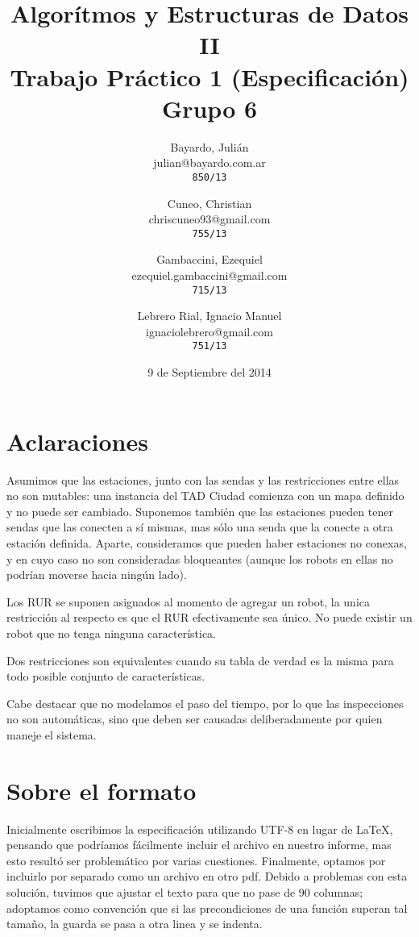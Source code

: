 \documentclass[a4paper,titlepage]{article}
\begin{document}
\title{Algorítmos y Estructuras de Datos II\\
Trabajo Práctico 1 (Especificación)\\
Grupo 6}

\author{
	Bayardo, Julián\\
	julian@bayardo.com.ar\\
	\texttt{850/13}
	\and
	Cuneo, Christian\\
	chriscuneo93@gmail.com\\
	\texttt{755/13}
	\and
	Gambaccini, Ezequiel\\
	ezequiel.gambaccini@gmail.com\\
	\texttt{715/13}
	\and
	Lebrero Rial, Ignacio Manuel\\
	ignaciolebrero@gmail.com\\
	\texttt{751/13}
}

\date{9 de Septiembre del 2014}

\maketitle

\section{Aclaraciones}

Asumimos que las estaciones, junto con las sendas y las restricciones entre ellas no son mutables: una instancia del TAD Ciudad comienza con un mapa definido y no puede ser cambiado. Suponemos también que las estaciones pueden tener sendas que las conecten a sí mismas, mas sólo una senda que la conecte a otra estación definida. Aparte, consideramos que pueden haber estaciones no conexas, y en cuyo caso no son consideradas bloqueantes (aunque los robots en ellas no podrían moverse hacia ningún lado).

Los RUR se suponen asignados al momento de agregar un robot, la unica restricción al respecto es que el RUR efectivamente sea único. No puede existir un robot que no tenga ninguna característica.

Dos restricciones son equivalentes cuando su tabla de verdad es la misma para todo posible conjunto de características.

Cabe destacar que no modelamos el paso del tiempo, por lo que las inspecciones no son automáticas, sino que deben ser causadas deliberadamente por quien maneje el sistema.

\section{Sobre el formato}

Inicialmente escribimos la especificación utilizando UTF-8 en lugar de LaTeX, pensando que podríamos fácilmente incluir el archivo en nuestro informe, mas esto resultó ser problemático por varias cuestiones. Finalmente, optamos por incluirlo por separado como un archivo en otro pdf. Debido a problemas con esta solución, tuvimos que ajustar el texto para que no pase de 90 columnas; adoptamos como convención que si las precondiciones de una función superan tal tamaño, la guarda se pasa a otra linea y se indenta.


\end{document}
